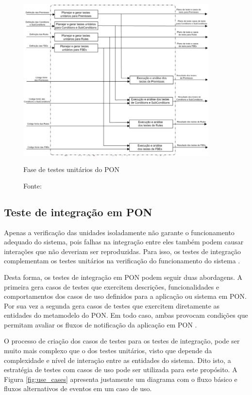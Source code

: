 \begin{figure}[!htb]
  \centering
  \includegraphics[width=0.9\textwidth]{../figures/unit_pon.png}
  \smallskip
  \caption{Fase de testes unitários do PON}
  \caption*{Fonte: }
  \label{fig:unit_pon}
\end{figure}

\subsection{Teste de integração em PON}\label{sec:int_pon}

Apenas a verificação das unidades isoladamente não garante o funcionamento
adequado do sistema, pois falhas na integração entre eles também podem causar
interações que não deveriam ser reproduzidas. Para isso, os testes de integração
complementam os testes unitários na verificação do funcionamento do sistema
\cite{binder_1999}.

Desta forma, os testes de integração em PON podem seguir duas abordagens. A
primeira gera casos de testes que exercitem descrições, funcionalidades e
comportamentos dos casos de uso definidos para a aplicação ou sistema em PON.
Por sua vez a segunda gera casos de testes que exercitem diretamente as
entidades do metamodelo do PON. Em todo caso, ambas provocam condições que
permitam avaliar os fluxos de notificação da aplicação em PON
\cite{msc_Kossoski_2015}.

O processo de criação dos casos de testes para os testes de integração, pode ser
muito mais complexo que o dos testes unitários, visto que depende da
complexidade e nível de interação entre as entidades do sistema. Dito isto, a
estratégia de testes com casos de uso pode ser utilizada para este propósito. A
Figura \ref{fig:use_cases} apresenta justamente um diagrama com o fluxo básico e
fluxos alternativos de eventos em um caso de uso. 

